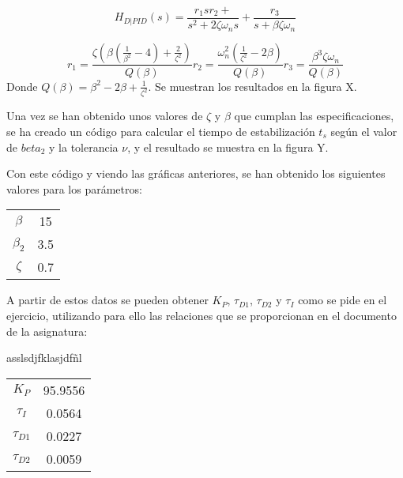 \documentclass[a4paper]{article}
\begin{document}
\begin{equation}
	H_{D|PID}(s)=\frac{r_1 s r_2+}{s^2 + 2\zeta \omega_n s} + \frac{r_3}{s+ \beta \zeta \omega_n}
\end{equation}

\begin{subequations}
	\begin{equation}
		r_1 = \frac{\zeta(\beta(\frac{1}{\beta^2}-4)+\frac{2}{\zeta^2})}{Q(\beta)}
	\end{equation}
	\begin{equation}
		r_2 = \frac{\omega_n^2(\frac{1}{\zeta^2}-2\beta)}{Q(\beta)}
	\end{equation}
	\begin{equation}
		r_3=\frac{\beta^3 \zeta \omega_n}{Q(\beta)}
	\end{equation}
\end{subequations}
Donde $Q(\beta)=\beta^2-2 \beta + \frac{1}{\zeta^2}$.
Se muestran los resultados en la figura X.

Una vez se han obtenido unos valores de $\zeta$ y $\beta$ que cumplan las especificaciones, se ha creado un código para calcular el tiempo de estabilización $t_s$ según el valor de $beta_2$ y la tolerancia $\nu$, y el resultado se muestra en la figura Y.

Con este código y viendo las gráficas anteriores, se han obtenido los siguientes valores para los parámetros:

\begin{center}
	\begin{tabular}{c|c}
			$\beta$ & 15 \\
			$\beta_2$ & 3.5 \\
			$\zeta$ & 0.7 \\
	\end{tabular}
\end{center}

A partir de estos datos se pueden obtener $K_P$, $\tau_{D1}$, $\tau_{D2}$ y $\tau_I$ como se pide en el ejercicio, utilizando para ello las relaciones que se proporcionan en el documento de la asignatura:



asslsdjfklasjdfñl



\begin{center}
	\begin{tabular}{c|c}
		$K_P$ & 95.9556 \\
		$\tau_I$ & 0.0564 \\
		$\tau_{D1}$ & 0.0227 \\
		$\tau_{D2}$ & 0.0059 \\
	\end{tabular}
\end{center}
\end{document}
